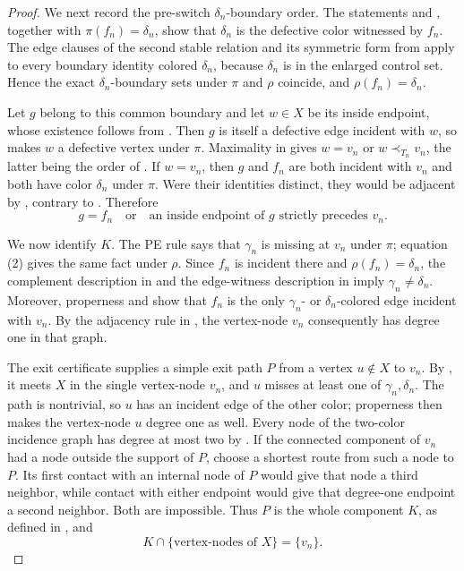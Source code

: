 \begin{proof}
We next record the pre-switch \(\delta_n\)-boundary order.  The statements
 and , together with
\(\pi(f_n)=\delta_n\), show that \(\delta_n\) is the defective color
witnessed by \(f_n\).  The edge clauses of the second stable relation and
its symmetric form from  apply to every boundary identity
colored \(\delta_n\), because \(\delta_n\) is in the enlarged control
set.  Hence the exact \(\delta_n\)-boundary sets under \(\pi\) and
\(\rho\) coincide, and \(\rho(f_n)=\delta_n\).

Let \(g\) belong to this common boundary and let \(w\in X\) be its inside
endpoint, whose existence follows from .  Then
\(g\) is itself a defective edge incident with \(w\), so
 makes \(w\) a defective vertex under \(\pi\).
Maximality in  gives
\(w=v_n\) or \(w\prec_{T_n}v_n\), the latter being the order of
.  If \(w=v_n\), then \(g\) and \(f_n\) are
both incident with \(v_n\) and both have color \(\delta_n\) under
\(\pi\).  Were their identities distinct, they would be adjacent by
, contrary to .
Therefore
\[
 g=f_n\quad\text{or}\quad
 \text{an inside endpoint of }g\text{ strictly precedes }v_n.     \tag{3}
\]

We now identify \(K\).  The PE rule 
says that \(\gamma_n\) is missing at \(v_n\) under \(\pi\); equation
(2) gives the same fact under \(\rho\).  Since \(f_n\) is incident there
and \(\rho(f_n)=\delta_n\), the complement description in
 and the edge-witness description in
 imply \(\gamma_n\ne\delta_n\).  Moreover,
properness and  show that \(f_n\) is the only
\(\gamma_n\)- or \(\delta_n\)-colored edge incident with \(v_n\).
By the adjacency rule in , the vertex-node
\(v_n\) consequently has degree one in that graph.

The exit certificate  supplies a simple exit path
\(P\) from a vertex \(u\notin X\) to \(v_n\).  By
, it meets \(X\) in the single vertex-node \(v_n\),
and \(u\) misses at least one of \(\gamma_n,\delta_n\).  The path is
nontrivial, so \(u\) has an incident edge of the other color; properness
then makes the vertex-node \(u\) degree one as well.  Every node of the
two-color incidence graph has degree at most two by
.  If the connected component
of \(v_n\) had a node outside the support of \(P\), choose a shortest
route from such a node to \(P\).  Its first contact with an internal node
of \(P\) would give that node a third neighbor, while contact with either
endpoint would give that degree-one endpoint a second neighbor.  Both are
impossible.  Thus \(P\) is the whole component \(K\), as defined in
, and
\[
 K\cap\{\text{vertex-nodes of }X\}=\{v_n\}.                       \tag{4}
\]


\end{proof}
